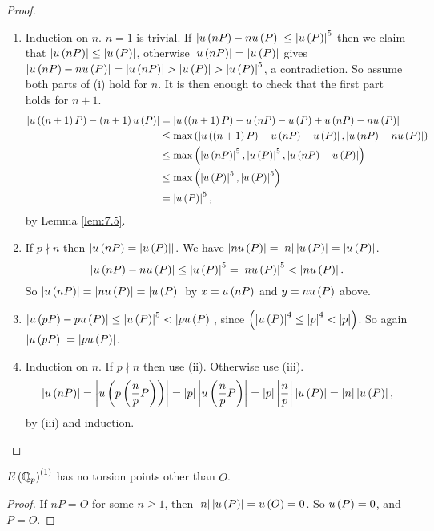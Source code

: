 \pagebreak

\begin{proof}
\hfill
\begin{enumerate}
\item Induction on $ n $. $ n = 1 $ is trivial. If $ \abs{u\rb{nP} - nu\rb{P}} \le \abs{u\rb{P}}^5 $ then we claim that $ \abs{u\rb{nP}} \le \abs{u\rb{P}} $, otherwise $ \abs{u\rb{nP}} = \abs{u\rb{P}} $ gives $ \abs{u\rb{nP} - nu\rb{P}} = \abs{u\rb{nP}} > \abs{u\rb{P}} > \abs{u\rb{P}}^5 $, a contradiction. So assume both parts of (i) hold for $ n $. It is then enough to check that the first part holds for $ n + 1 $.
\begin{align*}
\abs{u\rb{\rb{n + 1}P} - \rb{n + 1}u\rb{P}}
& = \abs{u\rb{\rb{n + 1}P} - u\rb{nP} - u\rb{P} + u\rb{nP} - nu\rb{P}} \\
& \le \max\rb{\abs{u\rb{\rb{n + 1}P} - u\rb{nP} - u\rb{P}}, \abs{u\rb{nP} - nu\rb{P}}} \\
& \le \max\rb{\abs{u\rb{nP}}^5, \abs{u\rb{P}}^5, \abs{u\rb{nP} - u\rb{P}}} \\
& \le \max\rb{\abs{u\rb{P}}^5, \abs{u\rb{P}}^5} \\
& = \abs{u\rb{P}}^5,
\end{align*}
by Lemma \ref{lem:7.5}.
\item If $ p \nmid n $ then $ \abs{u\rb{nP} = \abs{u\rb{P}}} $. We have $ \abs{nu\rb{P}} = \abs{n}\abs{u\rb{P}} = \abs{u\rb{P}} $.
$$ \abs{u\rb{nP} - nu\rb{P}} \le \abs{u\rb{P}}^5 = \abs{nu\rb{P}}^5 < \abs{nu\rb{P}}. $$
So $ \abs{u\rb{nP}} = \abs{nu\rb{P}} = \abs{u\rb{P}} $ by $ x = u\rb{nP} $ and $ y = nu\rb{P} $ above.
\item $ \abs{u\rb{pP} - pu\rb{P}} \le \abs{u\rb{P}}^5 < \abs{pu\rb{P}} $, since $ \rb{\abs{u\rb{P}}^4 \le \abs{p}^4 < \abs{p}} $. So again $ \abs{u\rb{pP}} = \abs{pu\rb{P}} $.
\item Induction on $ n $. If $ p \nmid n $ then use (ii). Otherwise use (iii).
$$ \abs{u\rb{nP}} = \abs{u\rb{p\rb{\dfrac{n}{p}P}}} = \abs{p}\abs{u\rb{\dfrac{n}{p}P}} = \abs{p}\abs{\dfrac{n}{p}}\abs{u\rb{P}} = \abs{n}\abs{u\rb{P}}, $$
by (iii) and induction.
\end{enumerate}
\end{proof}

\begin{corollary}
\label{cor:7.7}
$ E\rb{\Q_p}^{\rb{1}} $ has no torsion points other than $ O $.
\end{corollary}

\begin{proof}
If $ nP = O $ for some $ n \ge 1 $, then $ \abs{n}\abs{u\rb{P}} = u\rb{O} = 0 $. So $ u\rb{P} = 0 $, and $ P = O $.
\end{proof}

